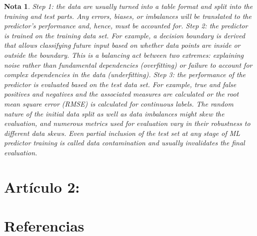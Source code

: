 \documentclass[12pt]{article}
\newtheorem{Note}{Nota}%
\begin{document}
\begin{Note}
Step 1: the data are usually turned into a table format and split into the training and test parts. Any errors, biases, or imbalances will be translated to the predictor’s performance and, hence, must be accounted for. Step 2: the predictor is trained on the training data set. For example, a decision boundary is derived that allows classifying future input based on whether data points are inside or outside the boundary. This is a balancing act between two extremes: explaining noise rather than fundamental dependencies (overfitting) or failure to account for complex dependencies in the data (underfitting). Step 3: the performance of the predictor is evaluated based on the test data set. For example, true and false positives and negatives and the associated measures are calculated or the root mean square error (RMSE) is calculated for continuous labels. The random nature of the initial data split as well as data imbalances might skew the evaluation, and numerous metrics used for evaluation vary in their robustness to different data skews. Even partial inclusion of the test set at any stage of ML predictor training is called data contamination and usually invalidates the final evaluation.

\end{Note}

\section{Artículo 2: }



\section{Referencias}
\end{document}
